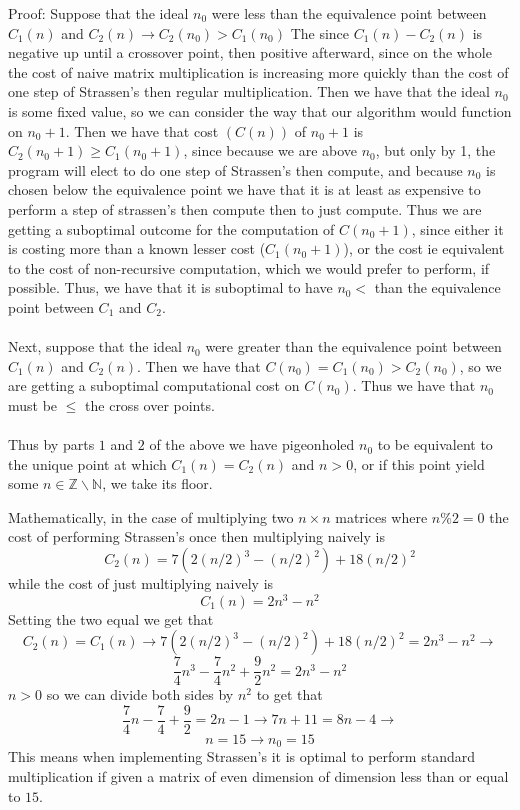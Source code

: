 \documentclass[10pt,letter]{article}
\begin{document}
Proof: Suppose that the ideal $n_0$ were less than the equivalence point between $C_1(n)$ and $C_2(n)\rightarrow C_2(n_0) > C_1(n_0)$ The since $C_1(n) - C_2(n)$ is negative up until a crossover point, then positive afterward, since on the whole the cost of naive matrix multiplication is increasing more quickly than the cost of one step of Strassen's then regular multiplication. Then we have that the ideal $n_0$ is some fixed value, so we can consider the way that our algorithm would function on $n_0+1$. Then we have that cost $(C(n))$ of $n_0+1$ is $C_2(n_0+1) \ge C_1(n_0+1)$, since because we are above $n_0$, but only by 1, the program will elect to do one step of Strassen's then compute, and because $n_0$ is chosen below the equivalence point we have that it is at least as expensive to perform a step of strassen's then compute then to just compute. Thus we are getting a suboptimal outcome for the computation of $C(n_0+1)$, since either it is costing more than a known lesser cost ($C_1(n_0+1)$), or the cost ie equivalent to the cost of non-recursive computation, which we would prefer to perform, if possible. Thus, we have that it is suboptimal to have $n_0 <$ than the equivalence point between $C_1$ and $C_2$. \\ \\
Next, suppose that the ideal $n_0$ were greater than the equivalence point between $C_1(n)$ and $C_2(n)$. Then we have that $C(n_0) = C_1(n_0) > C_2(n_0)$, so we are getting a suboptimal computational cost on $C(n_0)$. Thus we have that $n_0$ must be $\le $ the cross over points. \\ \\
Thus by parts $1$ and $2$ of the above we have pigeonholed $n_0$ to be equivalent to the unique point at which $C_1(n) = C_2(n)$ and $n > 0$, or if this point yield some $n \in \mathbb{Z} \backslash \mathbb{N}$, we take its floor. 


 Mathematically, in the case of multiplying two $n \times n$ matrices where $n \% 2 = 0$ the cost of performing Strassen's once then multiplying naively is
$$C_2(n) = 7(2(n/2)^3-(n/2)^2) + 18(n/2)^2$$ while the cost of just multiplying naively is
$$C_1(n) = 2n^3-n^2$$ Setting the two equal we get that
$$C_2(n) = C_1(n) \rightarrow  7(2(n/2)^3-(n/2)^2) + 18(n/2)^2 = 2n^3-n^2 \rightarrow $$
$$\frac{7}{4}n^3 - \frac{7}{4}n^2 + \frac{9}{2}n^2 = 2n^3 -n^2$$ $n > 0$ so we can divide both sides by $n^2$ to get that
$$\frac{7}{4}n - \frac{7}{4} + \frac{9}{2} = 2n -1 \rightarrow 7n + 11 = 8n-4 \rightarrow $$
$$n = 15 \rightarrow \boxed{n_0 = 15}$$
This means when implementing Strassen's it is optimal to perform standard multiplication if given a matrix of even dimension of dimension less than or equal to $15$. \\ \\
\end{document}
